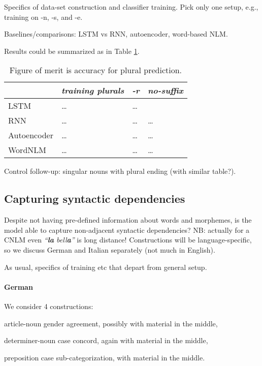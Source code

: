Specifics of data-set construction and classifier training. Pick only one setup, e.g., training on -n, -s, and -e.

Baselines/comparisons: LSTM vs RNN, autoencoder, word-based NLM.

Results could be summarized as in Table \ref{tab:number-results}.


\begin{table}[t]
  \begin{center}
    \begin{tabular}{l|l|l|l}
      \multicolumn{1}{c}{}&\emph{training plurals}&\emph{-r}&\emph{no-suffix}\\
      \hline
      LSTM&\ldots&\ldots\\
      RNN&\ldots&\ldots&\ldots\\
      Autoencoder&\ldots&\ldots&\ldots\\
      WordNLM&\ldots&\ldots&\ldots\\
    \end{tabular}
  \end{center}
  \caption{\label{tab:number-results} Figure of merit is accuracy for plural prediction.}
\end{table}


Control follow-up: singular nouns with plural ending (with similar table?).

\subsection{Capturing syntactic dependencies}
\label{sec:dependencies}

Despite not having pre-defined information about words and morphemes,
is the model able to capture non-adjacent syntactic dependencies? NB:
actually for a CNLM even \emph{``\textbf{la} bell\textbf{a}''} is long
distance! Constructions will be language-specific, so we discuss
German and Italian separately (not much in English).

As usual, specifics of training etc that depart from general setup.

\paragraph{German} We consider 4 constructions:
\begin{inparaenum}[i)]
\item article-noun gender agreement, possibly with material in the middle,
\item determiner-noun case concord, again with material in the middle,
\item preposition case sub-categorization, with material in the middle.
\end{inparaenum}

